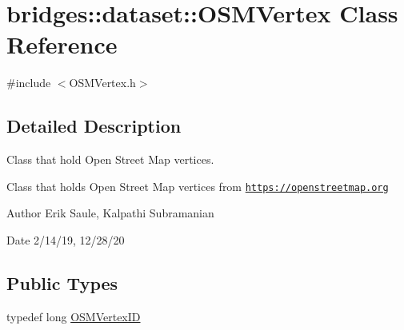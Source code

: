 \hypertarget{classbridges_1_1dataset_1_1_o_s_m_vertex}{}\section{bridges\+:\+:dataset\+:\+:O\+S\+M\+Vertex Class Reference}
\label{classbridges_1_1dataset_1_1_o_s_m_vertex}


{\ttfamily \#include $<$O\+S\+M\+Vertex.\+h$>$}



\subsection{Detailed Description}
Class that hold Open Street Map vertices. 

Class that holds Open Street Map vertices from \href{https://openstreetmap.org}{\tt https\+://openstreetmap.\+org}

\begin{DoxyAuthor}{Author}
Erik Saule, Kalpathi Subramanian 
\end{DoxyAuthor}
\begin{DoxyDate}{Date}
2/14/19, 12/28/20 
\end{DoxyDate}
\subsection*{Public Types}
\begin{DoxyCompactItemize}
\item 
typedef long \hyperlink{classbridges_1_1dataset_1_1_o_s_m_vertex_ad166f13b0aefbdc05a273546f2a3bb96}{O\+S\+M\+Vertex\+ID}
\end{DoxyCompactItemize}
